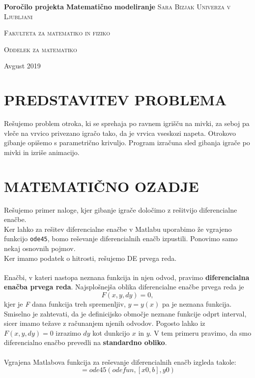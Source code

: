 \documentclass[a4paper,12pt]{article}
\begin{document}

\begin{titlepage}
    \centering
    \vfill
    \vfill
    \textbf{\Huge{Poročilo projekta}}
    \vfill
    \textbf{\LARGE{Matematično modeliranje}}
    \vfill\vfill\vfill\vfill\vfill
    \textsc{\Large{Sara Bizjak}}
    \vfill\vfill
    \textsc{\large{Univerza v Ljubljani}}
    
    \textsc{\large{Fakulteta za matematiko in fiziko}}
    
    \textsc{\large{Oddelek za matematiko}}
    \vfill\vfill
        
    \large{Avgust 2019}
    
    \end{titlepage}

\newpage

\tableofcontents

\newpage

\section{\textsc{\large{PREDSTAVITEV PROBLEMA}}}

Rešujemo problem otroka, ki se sprehaja po ravnem igrišču na mivki, za seboj pa vleče na 
vrvico privezano igračo tako, da je vrvica vseskozi napeta. Otrokovo gibanje opišemo s 
parametrično krivuljo. Program izračuna sled gibanja igrače po mivki in izriše animacijo.
\\

\section{\textsc{\large{MATEMATIČNO OZADJE}}}

Rešujemo primer naloge, kjer gibanje igrače določimo z rešitvijo diferencialne enačbe. \\
Ker lahko za rešitev diferencialne enačbe v Matlabu uporabimo že vgrajeno funkcijo {\texttt{ode45}}, bomo reševanje diferencialnih enačb izpustili. 
Ponovimo samo nekaj osnovnih pojmov.
\\
Ker imamo podatek o hitrosti, rešujemo DE prvega reda.
\\
\\
Enačbi, v kateri nastopa neznana funkcija in njen odvod, pravimo \textbf{diferencialna enačba prvega reda}. 
Najsplošnejša oblika diferencialne enačbe prvega reda je
\begin{displaymath}
F(x, y, dy) = 0,
\end{displaymath}
kjer je \textit{F} dana funkcija treh spremenljiv, $y = y(x)$ pa je neznana funkcija.
Smiselno je zahtevati, da je definicijsko območje neznane funkcije odprt interval,
sicer imamo težave z računanjem njenih odvodov.
Pogosto lahko iz $F(x, y, dy) = 0$ izrazimo $dy$ kot dunkcijo $x$ in $y$. V tem primeru pravimo,
da smo diferencialno enačbo prevedli na \textbf{standardno obliko}.
\\
\\
Vgrajena Matlabova funkcija za reševanje diferencialnih enačb izgleda takole:
\begin{displaymath}
[X, Y] = ode45(odefun, [x0, b], y0)
\end{displaymath}
\end{document}
